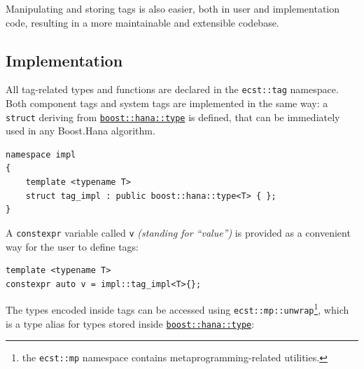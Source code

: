 \documentclass[oneside, 12pt, a4paper, openany]{book}
\begin{document}
Manipulating and storing tags is also easier, both in user and
implementation code, resulting in a more maintainable and extensible
codebase.

\subsection{Implementation}\label{implementation-3}

All tag-related types and functions are declared in the
\texttt{ecst::tag}
namespace. Both component tags and system tags are implemented in the
same way: a
\texttt{struct}
deriving from
\href{http://www.boost.org/doc/libs/1_61_0/libs/hana/doc/html/structboost_1_1hana_1_1type.html}{\texttt{boost::hana::type}}
is defined, that can be immediately used in any Boost.Hana algorithm.

\begin{verbatim}
namespace impl
{
    template <typename T>
    struct tag_impl : public boost::hana::type<T> { };
}
\end{verbatim}

A
\texttt{constexpr}
variable called
\texttt{v}
\emph{(standing for ``value'')} is provided as a convenient way for the
user to define tags:

\begin{verbatim}
template <typename T>
constexpr auto v = impl::tag_impl<T>{};
\end{verbatim}

The types encoded inside tags can be accessed using
\texttt{ecst::mp::unwrap}\footnote{the
  \texttt{ecst::mp}
  namespace contains metaprogramming-related utilities.}, which is a
type alias for types stored inside
\href{http://www.boost.org/doc/libs/1_61_0/libs/hana/doc/html/structboost_1_1hana_1_1type.html}{\texttt{boost::hana::type}}:
\end{document}
